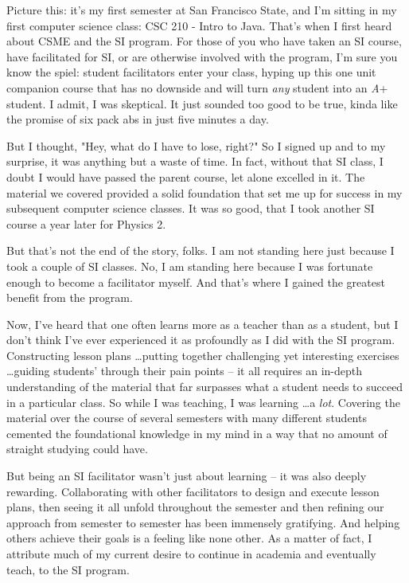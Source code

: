 \documentclass{article}
\begin{document}
Picture this: it's my first semester at San Francisco State, and I'm sitting in
my first computer science class: CSC 210 - Intro to Java.  That's when I first
heard about CSME and the SI program. For those of you who have taken an SI course,
have facilitated for SI, or are otherwise involved with the program, I'm sure
you know the spiel:
student facilitators enter your class, hyping up this one unit companion course
that has no downside and will turn \emph{any} student into an \emph{A}+ student.
I admit, I was skeptical. It just sounded too good to be true, kinda like the
promise of six pack abs in just five minutes a day.

But I thought, "Hey, what do I have to lose, right?" So I signed up and to my surprise,
it was anything but a waste of time. In fact, without that SI class, I
doubt I would have passed the parent course, let alone excelled in it.  The
material we covered provided a solid foundation that
set me up for success in my subsequent computer science classes.  It was so good,
that I took another SI course a year later for Physics 2.

But that's not the end of the story, folks.
I am not standing here just because I took a couple of SI classes. No, I am
standing here because I was fortunate enough to become a facilitator myself.
And that's where I gained the greatest benefit from the program.

Now, I've heard that one often learns more as a teacher than as a student,
but I don't think I've ever experienced it as profoundly as I did with the SI
program.  Constructing lesson plans \dots putting together challenging yet
interesting exercises \dots guiding students' through their pain points -- it
all requires an in-depth understanding of the material that far surpasses what a
student needs to succeed in a particular class.  So while I was
teaching, I was learning \dots a \emph{lot}.  Covering the material over the
course of several semesters with many different students cemented the
foundational knowledge in my mind in a way that no amount of straight studying
could have.

But being an SI facilitator wasn't just about learning -- it was also deeply rewarding.
Collaborating with other facilitators to design and execute lesson
plans, then seeing it all unfold throughout the semester and then refining our
approach from semester to semester has been immensely gratifying.  And helping others achieve
their goals is a feeling like none other.  As a matter of fact, I attribute much
of my current desire to continue in academia and eventually teach, to the SI program.
\end{document}
